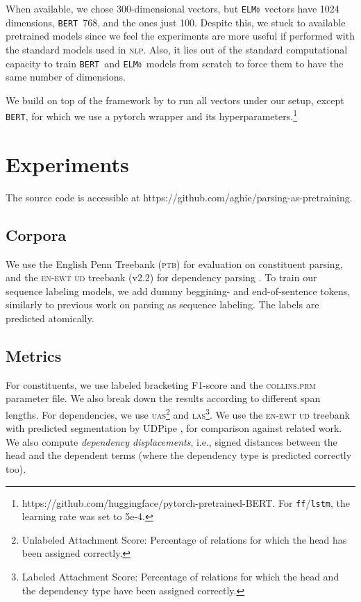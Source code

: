 \documentclass[letterpaper]{article} %
\newcommand{\citet}[1]{\citeauthor{#1} \shortcite{#1}}
\newcommand{\elmo}{\texttt{\textsc{ELMo}}}
\newcommand{\bert}{\texttt{\textsc{BERT}}}
\begin{document}
When available, we chose 300-dimensional vectors, but \elmo\ vectors have 1024 dimensions, \bert\ 768, and the \citet{ling2015two} ones just 100. Despite  this, we stuck to available pretrained models since we feel the experiments are more useful if performed with the standard models used in \textsc{nlp}. Also, it lies out of the standard computational capacity to train \bert\ and \elmo\ models from scratch to force them to have the same number of dimensions.

We build on top of the framework by \citet{yang2018ncrf++} to run all vectors under our setup, except \bert, for which we use a pytorch wrapper and its hyperparameters.\footnote{https://github.com/huggingface/pytorch-pretrained-BERT. For \texttt{ff}/\texttt{lstm}, the learning rate was set to 5e-4.}


\section{Experiments}

The source code is accessible at https://github.com/aghie/parsing-as-pretraining.

\subsection{Corpora} We use the English Penn Treebank (\textsc{ptb}) \cite{marcus1993building} for evaluation on constituent parsing, and the \textsc{en-ewt} \textsc{ud} treebank (v2.2) for dependency parsing   \cite{UD2.1}. To train our sequence labeling models, we add dummy beggining- and end-of-sentence tokens, similarly to previous work on parsing as sequence labeling. The labels are predicted atomically.

\subsection{Metrics} For constituents, we use labeled bracketing F1-score and the \textsc{collins.prm} parameter file. We also break down the results according to different span lengths. For dependencies, we use \textsc{uas}\footnote{Unlabeled Attachment Score: Percentage of relations for which the head has been assigned correctly.} and \textsc{las}\footnote{Labeled Attachment Score: Percentage of relations for which the head and the dependency type have been assigned correctly.}.
We use the \textsc{en-ewt ud} treebank with predicted segmentation by UDPipe \cite{straka:2018:K18-2}, for comparison against related work. We also compute \emph{dependency displacements}, i.e., signed distances between the head and the dependent terms (where the dependency type is predicted correctly too).
\end{document}
